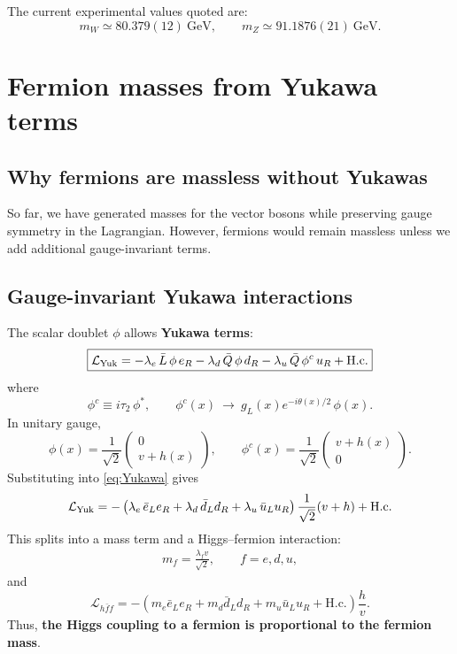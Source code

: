The current experimental values quoted are:
\begin{equation}
m_W\simeq 80.379(12)~\mathrm{GeV},
\qquad
m_Z\simeq 91.1876(21)~\mathrm{GeV}.
\end{equation}

\section{Fermion masses from Yukawa terms}
\subsection{Why fermions are massless without Yukawas}
So far, we have generated masses for the vector bosons while preserving gauge symmetry in the Lagrangian. However, fermions would remain massless unless we add additional gauge-invariant terms.

\subsection{Gauge-invariant Yukawa interactions}
The scalar doublet $\phi$ allows \textbf{Yukawa terms}:
\begin{equation}
\boxed{
\mathcal L_{\rm Yuk}
=
-\lambda_e\,\bar L\,\phi\,e_R
-\lambda_d\,\bar Q\,\phi\,d_R
-\lambda_u\,\bar Q\,\phi^c\,u_R
+\mathrm{H.c.}
}
\label{eq:Yukawa}
\end{equation}
where
\begin{equation}
\boxed{
\phi^c \equiv i\tau_2\,\phi^\ast,
\qquad
\phi^c(x)\ \longrightarrow\ g_L(x)e^{-i\theta(x)/2}\,\phi(x).
}
\label{eq:phic}
\end{equation}
In unitary gauge,
\[
\phi(x)=\frac{1}{\sqrt{2}}\begin{pmatrix}0\\ v+h(x)\end{pmatrix},
\qquad
\phi^c(x)=\frac{1}{\sqrt{2}}\begin{pmatrix}v+h(x)\\ 0\end{pmatrix}.
\]
Substituting into \eqref{eq:Yukawa} gives
\begin{equation}
\mathcal L_{\rm Yuk}
=
-\left(\lambda_e\,\bar e_L e_R+\lambda_d\,\bar d_L d_R+\lambda_u\,\bar u_L u_R\right)\frac{1}{\sqrt{2}}(v+h)
+\mathrm{H.c.}
\end{equation}
This splits into a mass term and a Higgs--fermion interaction:
\begin{align}
\boxed{
m_f = \frac{\lambda_f v}{\sqrt{2}},
\qquad f=e,d,u,
}
\label{eq:mf-lambda}
\end{align}
and
\begin{equation}
\boxed{
\mathcal L_{h\bar f f}
= -\left(m_e\bar e_L e_R+m_d\bar d_L d_R+m_u\bar u_L u_R+\mathrm{H.c.}\right)\frac{h}{v}.
}
\label{eq:hff}
\end{equation}
Thus, \textbf{the Higgs coupling to a fermion is proportional to the fermion mass}.

